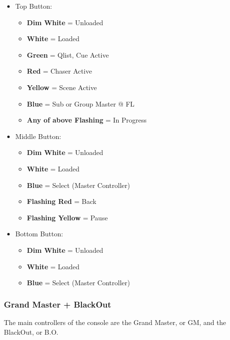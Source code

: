 \documentclass[
]{article}
\providecommand{\tightlist}{%
  \setlength{\itemsep}{0pt}\setlength{\parskip}{0pt}}
\begin{document}
\begin{itemize}
\tightlist
\item
  Top Button:

  \begin{itemize}
  \tightlist
  \item
    \textbf{Dim White} = Unloaded
  \item
    \textbf{White} = Loaded
  \item
    \textbf{Green} = Qlist, Cue Active
  \item
    \textbf{Red} = Chaser Active
  \item
    \textbf{Yellow} = Scene Active
  \item
    \textbf{Blue} = Sub or Group Master @ FL
  \item
    \textbf{Any of above Flashing} = In Progress
  \end{itemize}
\item
  Middle Button:

  \begin{itemize}
  \tightlist
  \item
    \textbf{Dim White} = Unloaded
  \item
    \textbf{White} = Loaded
  \item
    \textbf{Blue} = Select (Master Controller)
  \item
    \textbf{Flashing Red} = Back
  \item
    \textbf{Flashing Yellow} = Pause
  \end{itemize}
\item
  Bottom Button:

  \begin{itemize}
  \tightlist
  \item
    \textbf{Dim White} = Unloaded
  \item
    \textbf{White} = Loaded
  \item
    \textbf{Blue} = Select (Master Controller)
  \end{itemize}
\end{itemize}

\hypertarget{grand-master-blackout}{%
\subsubsection{Grand Master + BlackOut}\label{grand-master-blackout}}

The main controllers of the console are the Grand Master, or GM, and the BlackOut, or B.O.
\end{document}
